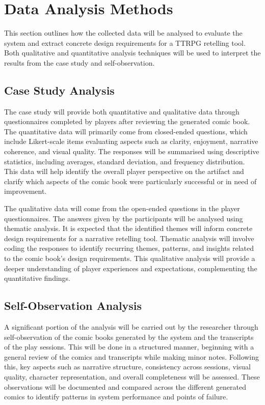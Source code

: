 \section{Data Analysis Methods}
This section outlines how the collected data will be analysed to evaluate the system and extract concrete design requirements for a TTRPG retelling tool. Both qualitative and quantitative analysis techniques will be used to interpret the results from the case study and self-observation.

\subsection*{Case Study Analysis}
The case study will provide both quantitative and qualitative data through questionnaires completed by players after reviewing the generated comic book. The quantitative data will primarily come from closed-ended questions, which include Likert-scale items evaluating aspects such as clarity, enjoyment, narrative coherence, and visual quality. The responses will be summarised using descriptive statistics, including averages, standard deviation, and frequency distribution. This data will help identify the overall player perspective on the artifact and clarify which aspects of the comic book were particularly successful or in need of improvement.

The qualitative data will come from the open-ended questions in the player questionnaires. The answers given by the participants will be analysed using thematic analysis. It is expected that the identified themes will inform concrete design requirements for a narrative retelling tool. Thematic analysis will involve coding the responses to identify recurring themes, patterns, and insights related to the comic book's design requirements. This qualitative analysis will provide a deeper understanding of player experiences and expectations, complementing the quantitative findings.

\subsection*{Self-Observation Analysis}
A significant portion of the analysis will be carried out by the researcher through self-observation of the comic books generated by the system and the transcripts of the play sessions. This will be done in a structured manner, beginning with a general review of the comics and transcripts while making minor notes. Following this, key aspects such as narrative structure, consistency across sessions, visual quality, character representation, and overall completeness will be assessed. These observations will be documented and compared across the different generated comics to identify patterns in system performance and points of failure.

